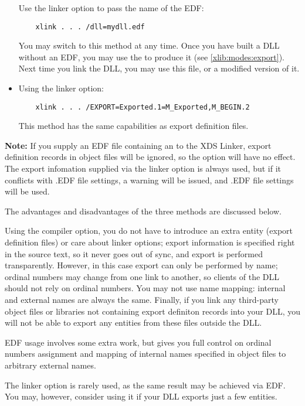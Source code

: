 \begin{itemize}
      Use the  linker option to pass the name of the
      EDF:

\verb'    xlink . . . /dll=mydll.edf'

      You may switch to this method at any time.
      Once you have built a DLL without an EDF, you may use the
       to produce it
      (see \ref{xlib:modes:export}).
      Next time you link the DLL, you may use this file,
      or a modified version of it.


\item Using the  linker option:

\verb'    xlink . . . /EXPORT=Exported.1=M_Exported,M_BEGIN.2'

      This method has the same capabilities as export definition files.
\end{itemize}

{\bf Note:} If you supply an EDF file containing an 
to the XDS Linker, export definition records in object files will be ignored,
so the  option will have no effect. The export infomation supplied
via the  linker option is always used, but if it conflicts
with .EDF file settings, a warning will be issued, and .EDF file settings will be used.

The advantages and disadvantages of the three methods are discussed below.

Using the  compiler option, you do not have to introduce an
extra entity (export definition files) or care about linker options;
export information is specified right in the source text,
so it never goes out of sync, and export is performed
transparently.
However, in this case export can only be performed by name;
ordinal numbers may change from one link to another, so clients
of the DLL should not rely on ordinal numbers. You may not use name mapping:
internal and external names are always the same.
Finally, if you link any third-party object files or libraries not containing export
definiton records into your DLL, you will not be able to export any entities
from these files outside the DLL.

EDF usage involves some extra work, but gives you full control
on ordinal numbers assignment and mapping of internal
names specified in object files to arbitrary external names.

The  linker option is rarely used, as the same result
may be achieved via EDF. You may, however, consider using it if your
DLL exports just a few entities.

